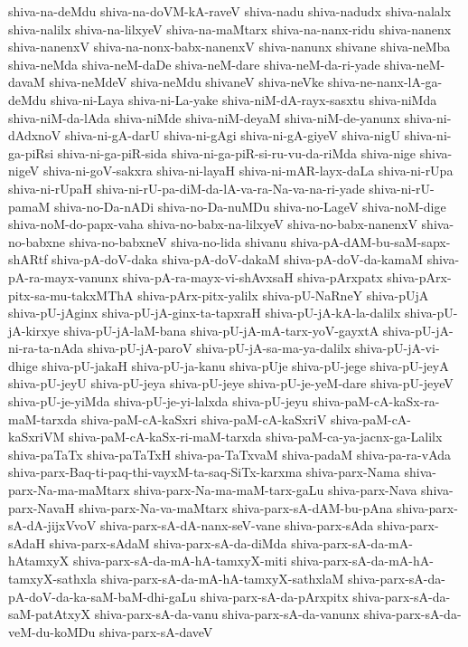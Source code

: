 {shiva-na-deMdu
shiva-na-doVM-kA-raveV
shiva-nadu
shiva-nadudx
shiva-nalalx
shiva-nalilx
shiva-na-lilxyeV
shiva-na-maMtarx
shiva-na-nanx-ridu
shiva-nanenx
shiva-nanenxV
shiva-na-nonx-babx-nanenxV
shiva-nanunx
shivane
shiva-neMba
shiva-neMda
shiva-neM-daDe
shiva-neM-dare
shiva-neM-da-ri-yade
shiva-neM-davaM
shiva-neMdeV
shiva-neMdu
shivaneV
shiva-neVke
shiva-ne-nanx-lA-ga-deMdu
shiva-ni-Laya
shiva-ni-La-yake
shiva-niM-dA-rayx-sasxtu
shiva-niMda
shiva-niM-da-lAda
shiva-niMde
shiva-niM-deyaM
shiva-niM-de-yanunx
shiva-ni-dAdxnoV
shiva-ni-gA-darU
shiva-ni-gAgi
shiva-ni-gA-giyeV
shiva-nigU
shiva-ni-ga-piRsi
shiva-ni-ga-piR-sida
shiva-ni-ga-piR-si-ru-vu-da-riMda
shiva-nige
shiva-nigeV
shiva-ni-goV-sakxra
shiva-ni-layaH
shiva-ni-mAR-layx-daLa
shiva-ni-rUpa
shiva-ni-rUpaH
shiva-ni-rU-pa-diM-da-lA-va-ra-Na-va-na-ri-yade
shiva-ni-rU-pamaM
shiva-no-Da-nADi
shiva-no-Da-nuMDu
shiva-no-LageV
shiva-noM-dige
shiva-noM-do-papx-vaha
shiva-no-babx-na-lilxyeV
shiva-no-babx-nanenxV
shiva-no-babxne
shiva-no-babxneV
shiva-no-lida
shivanu
shiva-pA-dAM-bu-saM-sapx-shARtf
shiva-pA-doV-daka
shiva-pA-doV-dakaM
shiva-pA-doV-da-kamaM
shiva-pA-ra-mayx-vanunx
shiva-pA-ra-mayx-vi-shAvxsaH
shiva-pArxpatx
shiva-pArx-pitx-sa-mu-takxMThA
shiva-pArx-pitx-yalilx
shiva-pU-NaRneY
shiva-pUjA
shiva-pU-jAginx
shiva-pU-jA-ginx-ta-tapxraH
shiva-pU-jA-kA-la-dalilx
shiva-pU-jA-kirxye
shiva-pU-jA-laM-bana
shiva-pU-jA-mA-tarx-yoV-gayxtA
shiva-pU-jA-ni-ra-ta-nAda
shiva-pU-jA-paroV
shiva-pU-jA-sa-ma-ya-dalilx
shiva-pU-jA-vi-dhige
shiva-pU-jakaH
shiva-pU-ja-kanu
shiva-pUje
shiva-pU-jege
shiva-pU-jeyA
shiva-pU-jeyU
shiva-pU-jeya
shiva-pU-jeye
shiva-pU-je-yeM-dare
shiva-pU-jeyeV
shiva-pU-je-yiMda
shiva-pU-je-yi-lalxda
shiva-pU-jeyu
shiva-paM-cA-kaSx-ra-maM-tarxda
shiva-paM-cA-kaSxri
shiva-paM-cA-kaSxriV
shiva-paM-cA-kaSxriVM
shiva-paM-cA-kaSx-ri-maM-tarxda
shiva-paM-ca-ya-jacnx-ga-Lalilx
shiva-paTaTx
shiva-paTaTxH
shiva-pa-TaTxvaM
shiva-padaM
shiva-pa-ra-vAda
shiva-parx-Baq-ti-paq-thi-vayxM-ta-saq-SiTx-karxma
shiva-parx-Nama
shiva-parx-Na-ma-maMtarx
shiva-parx-Na-ma-maM-tarx-gaLu
shiva-parx-Nava
shiva-parx-NavaH
shiva-parx-Na-va-maMtarx
shiva-parx-sA-dAM-bu-pAna
shiva-parx-sA-dA-jijxVvoV
shiva-parx-sA-dA-nanx-seV-vane
shiva-parx-sAda
shiva-parx-sAdaH
shiva-parx-sAdaM
shiva-parx-sA-da-diMda
shiva-parx-sA-da-mA-hAtamxyX
shiva-parx-sA-da-mA-hA-tamxyX-miti
shiva-parx-sA-da-mA-hA-tamxyX-sathxla
shiva-parx-sA-da-mA-hA-tamxyX-sathxlaM
shiva-parx-sA-da-pA-doV-da-ka-saM-baM-dhi-gaLu
shiva-parx-sA-da-pArxpitx
shiva-parx-sA-da-saM-patAtxyX
shiva-parx-sA-da-vanu
shiva-parx-sA-da-vanunx
shiva-parx-sA-da-veM-du-koMDu
shiva-parx-sA-daveV
}

